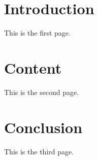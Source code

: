 \documentclass[a4paper,12pt]{article}
\begin{document}
\section{Introduction}
This is the first page.

\newpage
\section{Content}
This is the second page.

\newpage
\section{Conclusion}
This is the third page.
\end{document}
